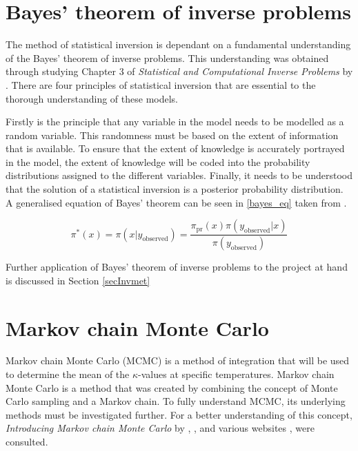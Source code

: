 %
%	

	
\section{Bayes' theorem of inverse problems}

	The method of statistical inversion is dependant on a fundamental understanding of the Bayes' theorem of inverse problems. 
	This understanding was obtained through studying Chapter 3 of \textit{Statistical and Computational Inverse Problems} by \citet{Kaipo:2005}.
	There are four principles of statistical inversion that are essential to the thorough understanding of these models.

	Firstly is the principle that any variable in the model needs to be modelled as a random variable.
	This randomness must be based on the extent of information that is available. 
	To ensure that the extent of knowledge is accurately portrayed in the model, the extent of knowledge will be coded into the probability distributions assigned to the different variables. 
	Finally, it needs to be understood that the solution of a statistical inversion is a posterior probability distribution.
	A generalised equation of Bayes' theorem can be seen in \ref{bayes_eq} taken from \citet{Kaipo:2005}.
	
	\begin{equation}
	\label{bayes_eq}
	\pi^* (x) = \pi (x|y_{\text{observed}}) = \frac{\pi_{\text{pr}} (x) \pi (y_{\text{observed}}|x)}{\pi  (y_{\text{observed}})}	
	\end{equation}
	
Further application of Bayes' theorem of inverse problems to the project at hand is discussed in Section \ref{secInvmet}
\section{Markov chain Monte Carlo} \label{MCMCdet}
Markov chain Monte Carlo  (MCMC) is a method of integration that will be used to determine the mean of the $\kappa$-values at specific temperatures. 
	Markov chain Monte Carlo is a method that was created by combining the concept of Monte Carlo sampling  and a Markov chain. 
	To fully understand MCMC, its underlying methods must be investigated further.
	For a better understanding of this concept, \textit{Introducing Markov chain Monte Carlo} by \citet{Gilks:1996}, \citet{Kaipo:2005}, and various websites \citet{MLM:2019}, \citet{dummies:2015} were consulted.

